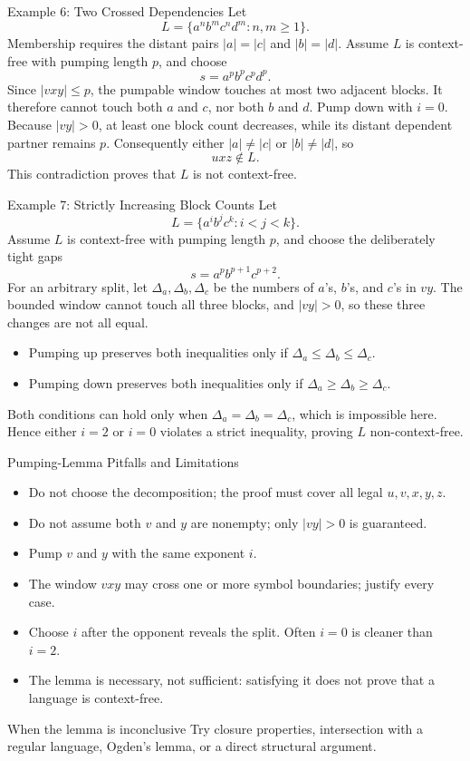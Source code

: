 \documentclass[10pt]{beamer}
\begin{document}
\begin{frame}{Example 6: Two Crossed Dependencies}
  \small
  Let
  \[
    L=\{a^n b^m c^n d^m:n,m\ge1\}.
  \]
  Membership requires the distant pairs $|a|=|c|$ and $|b|=|d|$. Assume
  $L$ is context-free with pumping length $p$, and choose
  \[
    s=a^pb^pc^pd^p.
  \]
  Since $|vxy|\le p$, the pumpable window touches at most two adjacent blocks.
  It therefore cannot touch both $a$ and $c$, nor both $b$ and $d$.
  Pump down with $i=0$. Because $|vy|>0$, at least one block count decreases,
  while its distant dependent partner remains $p$. Consequently either
  $|a|\ne|c|$ or $|b|\ne|d|$, so
  \[
    uxz\notin L.
  \]
  This contradiction proves that $L$ is not context-free.
\end{frame}

\begin{frame}{Example 7: Strictly Increasing Block Counts}
  \small
  Let
  \[
    L=\{a^i b^j c^k:i<j<k\}.
  \]
  Assume $L$ is context-free with pumping length $p$, and choose the
  deliberately tight gaps
  \[
    s=a^p b^{p+1}c^{p+2}.
  \]
  For an arbitrary split, let $\Delta_a,\Delta_b,\Delta_c$ be the numbers of
  $a$'s, $b$'s, and $c$'s in $vy$. The bounded window cannot touch all three
  blocks, and $|vy|>0$, so these three changes are not all equal.
  \begin{itemize}
    \item Pumping up preserves both inequalities only if
      $\Delta_a\le\Delta_b\le\Delta_c$.
    \item Pumping down preserves both inequalities only if
      $\Delta_a\ge\Delta_b\ge\Delta_c$.
  \end{itemize}
  Both conditions can hold only when
  $\Delta_a=\Delta_b=\Delta_c$, which is impossible here. Hence either
  $i=2$ or $i=0$ violates a strict inequality, proving $L$ non-context-free.
\end{frame}

\begin{frame}{Pumping-Lemma Pitfalls and Limitations}
  \small
  \begin{itemize}
    \item Do not choose the decomposition; the proof must cover all legal $u,v,x,y,z$.
    \item Do not assume both $v$ and $y$ are nonempty; only $|vy|>0$ is guaranteed.
    \item Pump $v$ and $y$ with the same exponent $i$.
    \item The window $vxy$ may cross one or more symbol boundaries; justify every case.
    \item Choose $i$ after the opponent reveals the split. Often $i=0$ is cleaner than $i=2$.
    \item The lemma is necessary, not sufficient: satisfying it does not prove that a language is context-free.
  \end{itemize}
  \begin{block}{When the lemma is inconclusive}
    Try closure properties, intersection with a regular language, Ogden's lemma, or a direct structural argument.
  \end{block}
\end{frame}
\end{document}
